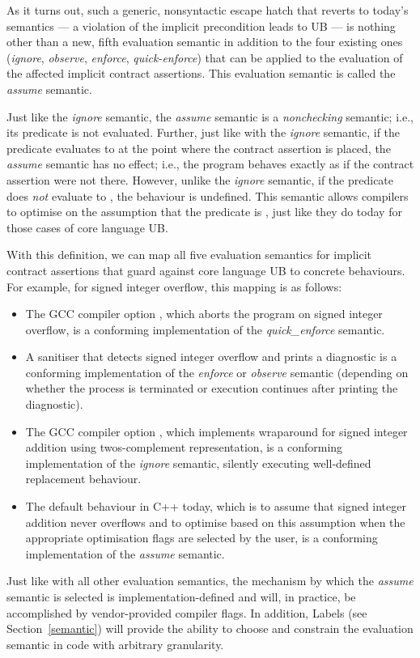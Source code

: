 As it turns out, such a generic, nonsyntactic escape hatch that reverts to today's semantics --- a violation of the implicit precondition leads to UB --- is nothing other than a new, fifth evaluation semantic in addition to the four existing ones (\emph{ignore}, \emph{observe}, \emph{enforce}, \emph{quick-enforce}) that can be applied to the evaluation of the affected implicit contract assertions. This evaluation semantic is called the \emph{assume} semantic.

Just like the \emph{ignore} semantic, the \emph{assume} semantic is a \emph{nonchecking} semantic; i.e., its predicate is not evaluated. Further, just like with the \emph{ignore} semantic, if the predicate evaluates to  at the point where the contract assertion is placed, the \emph{assume} semantic has no effect; i.e., the program behaves exactly as if the contract assertion were not there. However, unlike the \emph{ignore} semantic, if the predicate does \emph{not} evaluate to , the behaviour is undefined. This semantic allows compilers to optimise on the assumption that the predicate is , just like they do today for those cases of core language UB.

With this definition, we can map all five evaluation semantics for implicit contract assertions that guard against core language UB to concrete behaviours. For example, for signed integer overflow, this mapping is as follows:
\begin{itemize}
\item The GCC compiler option , which aborts the program on signed integer overflow, is a conforming implementation of the \emph{quick_enforce} semantic.
\item A sanitiser that detects signed integer overflow and prints a diagnostic is a conforming
implementation of the \emph{enforce} or \emph{observe} semantic (depending on whether the
process is terminated or execution continues after printing the diagnostic).
\item The GCC compiler option , which implements wraparound for signed integer addition using twos-complement representation, is a conforming implementation of the \emph{ignore} semantic,  silently executing well-defined replacement behaviour.
\item The default behaviour in C++ today, which is to assume that signed integer addition never overflows and to optimise based on this assumption when the appropriate optimisation flags are selected by the user, is a conforming implementation of the \emph{assume} semantic.
\end{itemize}
Just like with all other evaluation semantics, the mechanism by which the \emph{assume} semantic is selected is implementation-defined and will, in practice, be accomplished by vendor-provided compiler flags. In addition, Labels (see Section~\ref{semantic}) will provide the ability to choose and constrain the evaluation semantic in code with arbitrary granularity.

